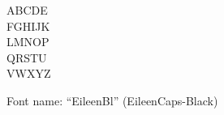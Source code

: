 \documentclass[a4paper]{article}
\begin{document}
\begin{center}
\fontsize{60pt}{72pt}
  ABCDE \\
  FGHIJK \\
  LMNOP \\
  QRSTU \\
  VWXYZ \\
\end{center}
\vfill
\begin{center}
Font name: ``EileenBl'' (EileenCaps-Black)
\end{center}
\end{document}
